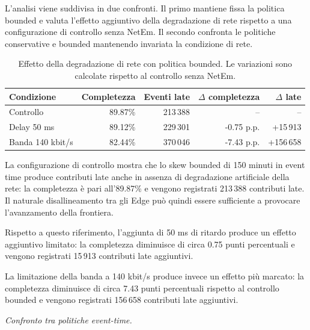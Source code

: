 L'analisi viene suddivisa in due confronti. Il primo mantiene fissa la
politica bounded e valuta l'effetto aggiuntivo della degradazione di rete
rispetto a una configurazione di controllo senza NetEm. Il secondo confronta
le politiche conservative e bounded mantenendo invariata la condizione di
rete.

\begin{table}[H]
    \caption{Effetto della degradazione di rete con politica bounded.
    Le variazioni sono calcolate rispetto al controllo senza NetEm.}
    \label{tab:network-bounded}
    \centering
    \begin{tabular}{@{}lrrrr@{}}
        \toprule
        Condizione &
        Completezza &
        Eventi late &
        $\Delta$ completezza &
        $\Delta$ late \\
        \midrule

        Controllo
        & 89.87\%
        & 213\,388
        & --
        & -- \\

        Delay 50 ms
        & 89.12\%
        & 229\,301
        & -0.75 p.p.
        & +15\,913 \\

        Banda 140 kbit/s
        & 82.44\%
        & 370\,046
        & -7.43 p.p.
        & +156\,658 \\

        \bottomrule
    \end{tabular}
\end{table}

La configurazione di controllo mostra che lo skew bounded di 150 minuti in
event time produce contributi late anche in assenza di degradazione
artificiale della rete: la completezza è pari all'89.87\% e vengono
registrati 213\,388 contributi late. Il naturale disallineamento tra gli
Edge può quindi essere sufficiente a provocare l'avanzamento della frontiera.

Rispetto a questo riferimento, l'aggiunta di 50 ms di ritardo produce un
effetto aggiuntivo limitato: la completezza diminuisce di circa 0.75 punti
percentuali e vengono registrati 15\,913 contributi late aggiuntivi.

La limitazione della banda a 140 kbit/s produce invece un effetto più
marcato: la completezza diminuisce di circa 7.43 punti percentuali rispetto
al controllo bounded e vengono registrati 156\,658 contributi late
aggiuntivi.


\textit{Confronto tra politiche event-time.}

